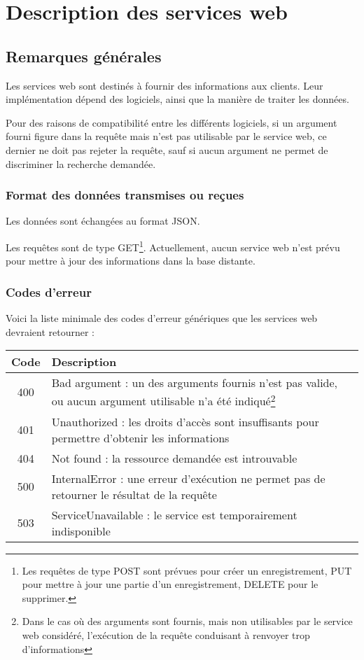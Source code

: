 \chapter{Description des services web}

\section{Remarques générales}

Les services web sont destinés à fournir des informations aux clients. Leur implémentation dépend des logiciels, ainsi que la manière de traiter les données.

Pour des raisons de compatibilité entre les différents logiciels, si un argument fourni figure dans la requête mais n'est pas utilisable par le service web, ce dernier ne doit pas rejeter la requête, sauf si aucun argument ne permet de discriminer la recherche demandée.

\subsection{Format des données transmises ou reçues}
Les données sont échangées au format JSON.

Les requêtes sont de type GET\footnote{Les requêtes de type POST sont prévues pour créer un enregistrement, PUT pour mettre à jour une partie d'un enregistrement, DELETE pour le supprimer.}. 
Actuellement, aucun service web n'est prévu pour mettre à jour des informations dans la base distante.

\subsection{Codes d'erreur}

Voici la liste minimale des codes d'erreur génériques que les services web devraient retourner :
\begin{longtable}{|c|>{\raggedright\arraybackslash}p{10cm}|}
\hline 
Code &  Description \\ 
\hline \endhead
400 & Bad argument : un des arguments fournis n'est pas valide, ou aucun argument utilisable n'a été indiqué\footnote{Dans le cas où des arguments sont fournis, mais non utilisables par le service web considéré, l'exécution de la requête conduisant à renvoyer trop d'informations} \\
\hline
401 & Unauthorized : les droits d'accès sont insuffisants pour permettre d'obtenir les informations \\
\hline
404 & Not found : la ressource demandée est introuvable\\
\hline
500 & InternalError : une erreur d'exécution ne permet pas de retourner le résultat de la requête\\
\hline
503 & ServiceUnavailable : le service est temporairement indisponible\\
\hline
\end{longtable} 


